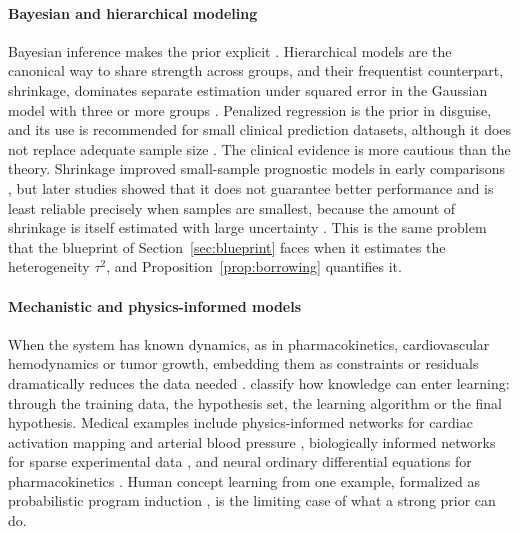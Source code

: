 \documentclass[acmsmall,screen,review]{acmart}
\theoremstyle{acmdefinition}
\begin{document}
\paragraph{Bayesian and hierarchical modeling} Bayesian inference makes the prior explicit \cite{gelman2013bayesian}. Hierarchical models are the canonical way to share strength across groups, and their frequentist counterpart, shrinkage, dominates separate estimation under squared error in the Gaussian model with three or more groups \cite{efron1973steins,stein1956inadmissibility}. Penalized regression \cite{hastie2009elements,tibshirani1996regression} is the prior in disguise, and its use is recommended for small clinical prediction datasets, although it does not replace adequate sample size \cite{riley2020calculating,smeden2019sample}. The clinical evidence is more cautious than the theory. Shrinkage improved small-sample prognostic models in early comparisons \cite{steyerberg2000prognostic}, but later studies showed that it does not guarantee better performance and is least reliable precisely when samples are smallest, because the amount of shrinkage is itself estimated with large uncertainty \cite{riley2021penalization,vancalster2020regression}. This is the same problem that the blueprint of Section~\ref{sec:blueprint} faces when it estimates the heterogeneity $\tau^2$, and Proposition~\ref{prop:borrowing} quantifies it.

\paragraph{Mechanistic and physics-informed models} When the system has known dynamics, as in pharmacokinetics, cardiovascular hemodynamics or tumor growth, embedding them as constraints or residuals dramatically reduces the data needed \cite{karniadakis2021physics,raissi2019physics}. \citet{rueden2023informed} classify how knowledge can enter learning: through the training data, the hypothesis set, the learning algorithm or the final hypothesis. Medical examples include physics-informed networks for cardiac activation mapping \cite{sahlicostabal2020physics} and arterial blood pressure \cite{kissas2020machine}, biologically informed networks for sparse experimental data \cite{lagergren2020biologically}, and neural ordinary differential equations for pharmacokinetics \cite{lu2021neural}. Human concept learning from one example, formalized as probabilistic program induction \cite{lake2015human}, is the limiting case of what a strong prior can do.
\end{document}
